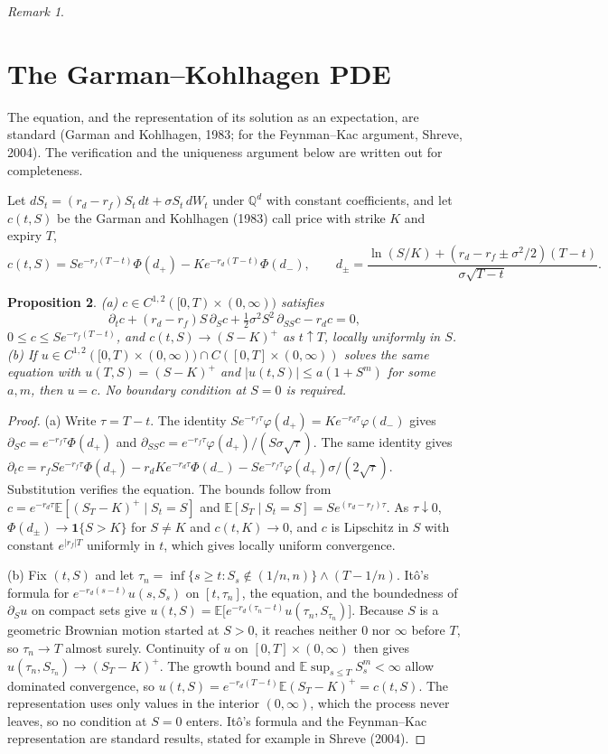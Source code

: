 \documentclass[11pt]{article}
\newtheorem{proposition}{Proposition}
\theoremstyle{remark}
\newtheorem{remark}[proposition]{Remark}
\newcommand{\E}{\mathbb{E}}
\newcommand{\Q}{\mathbb{Q}}
\begin{document}
\begin{remark}
\end{remark}

\section*{The Garman--Kohlhagen PDE}

The equation, and the representation of its solution as an expectation, are standard (Garman and Kohlhagen, 1983; for the Feynman--Kac argument, Shreve, 2004). The verification and the uniqueness argument below are written out for completeness.

Let $dS_t=(r_d-r_f)S_t\,dt+\sigma S_t\,dW_t$ under $\Q^d$ with constant coefficients, and let $c(t,S)$ be the Garman and Kohlhagen (1983) call price with strike $K$ and expiry $T$,
\[
c(t,S)=Se^{-r_f(T-t)}\Phi(d_+)-Ke^{-r_d(T-t)}\Phi(d_-),\qquad d_\pm=\frac{\ln(S/K)+(r_d-r_f\pm\sigma^2/2)(T-t)}{\sigma\sqrt{T-t}}.
\]

\begin{proposition}
(a) $c\in C^{1,2}([0,T)\times(0,\infty))$ satisfies
\[
\partial_tc+(r_d-r_f)S\,\partial_Sc+\tfrac12\sigma^2S^2\,\partial_{SS}c-r_dc=0,
\]
$0\le c\le Se^{-r_f(T-t)}$, and $c(t,S)\to(S-K)^+$ as $t\uparrow T$, locally uniformly in $S$. (b) If $u\in C^{1,2}([0,T)\times(0,\infty))\cap C([0,T]\times(0,\infty))$ solves the same equation with $u(T,S)=(S-K)^+$ and $|u(t,S)|\le a(1+S^m)$ for some $a,m$, then $u=c$. No boundary condition at $S=0$ is required.
\end{proposition}

\begin{proof}
(a) Write $\tau=T-t$. The identity $Se^{-r_f\tau}\varphi(d_+)=Ke^{-r_d\tau}\varphi(d_-)$ gives $\partial_Sc=e^{-r_f\tau}\Phi(d_+)$ and $\partial_{SS}c=e^{-r_f\tau}\varphi(d_+)/(S\sigma\sqrt\tau)$. The same identity gives $\partial_tc=r_fSe^{-r_f\tau}\Phi(d_+)-r_dKe^{-r_d\tau}\Phi(d_-)-Se^{-r_f\tau}\varphi(d_+)\sigma/(2\sqrt\tau)$. Substitution verifies the equation. The bounds follow from $c=e^{-r_d\tau}\E[(S_T-K)^+\mid S_t=S]$ and $\E[S_T\mid S_t=S]=Se^{(r_d-r_f)\tau}$. As $\tau\downarrow0$, $\Phi(d_\pm)\to\mathbf 1\{S>K\}$ for $S\ne K$ and $c(t,K)\to0$, and $c$ is Lipschitz in $S$ with constant $e^{|r_f|T}$ uniformly in $t$, which gives locally uniform convergence.

(b) Fix $(t,S)$ and let $\tau_n=\inf\{s\ge t:S_s\notin(1/n,n)\}\wedge(T-1/n)$. It\^o's formula for $e^{-r_d(s-t)}u(s,S_s)$ on $[t,\tau_n]$, the equation, and the boundedness of $\partial_Su$ on compact sets give $u(t,S)=\E\bigl[e^{-r_d(\tau_n-t)}u(\tau_n,S_{\tau_n})\bigr]$. Because $S$ is a geometric Brownian motion started at $S>0$, it reaches neither $0$ nor $\infty$ before $T$, so $\tau_n\to T$ almost surely. Continuity of $u$ on $[0,T]\times(0,\infty)$ then gives $u(\tau_n,S_{\tau_n})\to(S_T-K)^+$. The growth bound and $\E\sup_{s\le T}S_s^m<\infty$ allow dominated convergence, so $u(t,S)=e^{-r_d(T-t)}\E(S_T-K)^+=c(t,S)$. The representation uses only values in the interior $(0,\infty)$, which the process never leaves, so no condition at $S=0$ enters. It\^o's formula and the Feynman--Kac representation are standard results, stated for example in Shreve (2004).
\end{proof}
\end{document}
